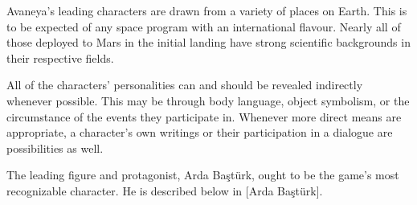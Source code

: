

Avaneya's leading characters are drawn from a variety of places on Earth. This is to be expected of any space program with an international flavour. Nearly all of those deployed to Mars in the initial landing have strong scientific backgrounds in their respective fields.

All of the characters' personalities can and should be revealed indirectly whenever possible. This may be through body language, object symbolism, or the circumstance of the events they participate in. Whenever more direct means are appropriate, a character's own writings or their participation in a dialogue are possibilities as well.

The leading figure and protagonist, Arda Baştürk, ought to be the game's most recognizable character. He is described below in [Arda Baştürk].

\page


\page


\page


\page


\page


\page


\StopChapter

